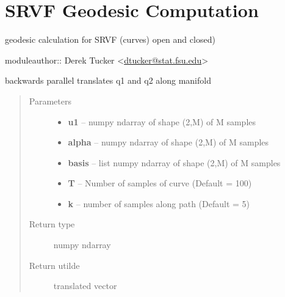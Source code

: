 \documentclass[letterpaper,10pt,english]{sphinxmanual}
\begin{document}
\chapter{SRVF Geodesic Computation}
\label{geodesic::doc}\label{geodesic:srvf-geodesic-computation}\label{geodesic:module-geodesic}
geodesic calculation for SRVF (curves) open and closed)

moduleauthor:: Derek Tucker \textless{}\href{mailto:dtucker@stat.fsu.edu}{dtucker@stat.fsu.edu}\textgreater{}

\begin{fulllineitems}
\label{geodesic:geodesic.back_parallel_transport}
backwards parallel translates q1 and q2 along manifold
\begin{quote}\begin{description}
\item[{Parameters}] \leavevmode\begin{itemize}
\item {} 
\textbf{u1} -- numpy ndarray of shape (2,M) of M samples

\item {} 
\textbf{alpha} -- numpy ndarray of shape (2,M) of M samples

\item {} 
\textbf{basis} -- list numpy ndarray of shape (2,M) of M samples

\item {} 
\textbf{T} -- Number of samples of curve (Default = 100)

\item {} 
\textbf{k} -- number of samples along path (Default = 5)

\end{itemize}

\item[{Return type}] \leavevmode
numpy ndarray

\item[{Return utilde}] \leavevmode
translated vector

\end{description}\end{quote}

\end{fulllineitems}

\end{document}
